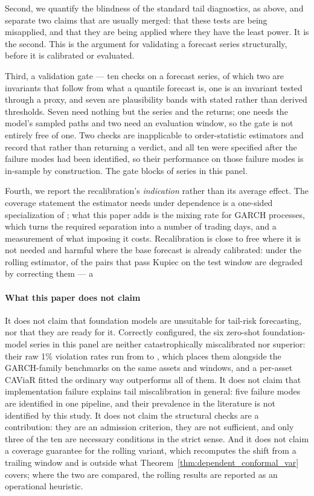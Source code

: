 \documentclass[preprint,11pt,authoryear]{elsarticle}
\newcommand{\1}{\boldsymbol{1}}
\begin{document}
Second, we quantify the blindness of the standard tail diagnostics, as above,
and separate two claims that are usually merged: that these tests are being
misapplied, and that they are being applied where they have the least power. It
is the second. This is the argument for validating a forecast series
structurally, before it is calibrated or evaluated.

Third, a validation gate --- ten checks on a forecast series, of
which two are invariants that follow from what a quantile forecast is, one is an
invariant tested through a proxy, and seven are plausibility bands with
stated rather than derived thresholds. Seven need nothing but the series and the
returns; one needs the model's sampled paths and two need an evaluation window,
so the gate is not entirely free of one. Two
checks are inapplicable to order-statistic estimators and record that rather than
returning a verdict, and all ten were specified after the failure modes had been
identified, so their performance on those failure modes is in-sample by
construction. The gate blocks \nGateBlocked{} of \nGateSeries{} series in this
panel.

Fourth, we report the recalibration's \emph{indication} rather than its average
effect. The coverage statement the estimator needs under dependence is a
one-sided specialization of \citet{oliveira2024split}; what this paper adds is
the mixing rate for GARCH processes, which turns the required separation into a
number of trading days, and a measurement of what imposing it costs.
Recalibration is close to free where it is not needed and harmful where the base
forecast is already calibrated: under the rolling estimator,
\nWellCalRollWorse{} of the \nWellCalRollN{} pairs that pass Kupiec on the test
window are degraded by correcting them --- a

\paragraph{What this paper does not claim} It does not claim that foundation
models are unsuitable for tail-risk forecasting, nor that they are ready for it.
Correctly configured, the six zero-shot foundation-model series in this panel are
neither catastrophically miscalibrated nor superior: their raw 1\% violation
rates run from \nRawPiTimesFM{} to \nRawPiLagLlama, which places them alongside
the GARCH-family benchmarks on the same assets and windows, and a per-asset
CAViaR \citep{engle2004caviar} fitted the ordinary way outperforms all of them.
It does not claim that implementation failure explains tail miscalibration in
general: five failure modes are identified in one pipeline, and their prevalence
in the literature is not identified by this study. It does not claim the
structural checks are a contribution: they are an admission criterion, they are
not sufficient, and only three of the ten are necessary conditions in the strict
sense. And it does not claim a coverage guarantee for the rolling variant, which
recomputes the shift from a trailing window and is outside what
Theorem~\ref{thm:dependent_conformal_var} covers; where the two are compared, the
rolling results are reported as an operational heuristic.
\end{document}
